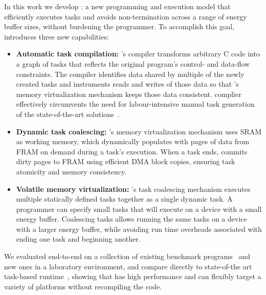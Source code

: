  In this work we develop {\bf \sys}: a new programming and execution model that efficiently executes tasks and avoids non-termination across a range of energy buffer sizes, without burdening the programmer. To accomplish this goal, \sys introduces three new capabilities: 

\begin{itemize}
	\item {\bf Automatic task compilation:} \sys's compiler transforms arbitrary C code into a graph of tasks that reflects the original program's control- and data-flow constraints. The compiler identifies data shared by multiple of the newly created tasks and instruments reads and writes of those data so that \sys's memory virtualization mechanism keeps those data consistent. \sys complier effectively circumvents the need for labour-intensive manual task generation of the state-of-the-art solutions~\cite{chain,alpaca}. 
	\item {\bf Dynamic task coalescing:} \sys's memory virtualization mechanism uses SRAM as working memory, which \sys dynamically populates with pages of data from FRAM on demand during a task's execution. When a task ends, \sys commits dirty pages to FRAM using efficient DMA block copies, ensuring task atomicity and memory consistency. 
	\item {\bf Volatile memory virtualization:} \sys's task coalescing mechanism executes multiple statically defined tasks together as a single dynamic task. A programmer can specify small tasks that will execute on a device with a small energy buffer. Coalescing tasks allows running the same tasks on a device with a larger energy buffer, while avoiding run time overheads associated with ending one task and beginning another.
\end{itemize}

We evaluated \sys end-to-end on a collection of existing benchmark programs~\cite[Sec. 5]{chain} and new ones in a laboratory environment, and compare directly to state-of-the art task-based runtime~\cite{chain}, showing that \sys has high performance and can flexibly target a variety of platforms without recompiling the code. 

